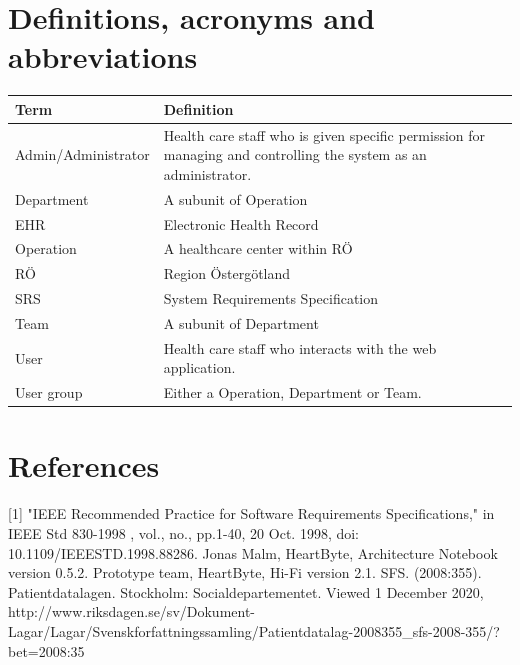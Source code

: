 \documentclass{scrreprt}
\begin{document}
\section{Definitions, acronyms and abbreviations}
\label{section:def}
\begin{center}
\begin{tabularx}{\linewidth}{| l | X |}
 \hline
 \textbf{Term} & \textbf{Definition} \\ 
 \hline
   Admin/Administrator & Health care staff who is given specific permission for managing and controlling the system as an administrator.  \\ 
  \hline
    Department & A subunit of Operation \\
  \hline
   EHR & Electronic Health Record \\ 
   \hline
      Operation & A healthcare center within RÖ \\ 
  \hline
    RÖ  & Region Östergötland  \\ 
  \hline
    SRS & System Requirements Specification \\
  \hline
    Team & A subunit of Department \\ 
  \hline
  User  & Health care staff who interacts with the web application.  \\
  \hline
  User group & Either a Operation, Department or Team. \\ 
  \hline
\end{tabularx}
\end{center}

\section{References}
[1] "IEEE Recommended Practice for Software Requirements Specifications," in IEEE Std 830-1998 , vol., no., pp.1-40, 20 Oct. 1998, doi: 10.1109/IEEESTD.1998.88286.
\newline
\newline
[2] Jonas Malm, HeartByte, Architecture Notebook version 0.5.2.
\newline
\newline
[3] Prototype team, HeartByte, Hi-Fi version 2.1. 
\newline
\newline
[4] SFS. (2008:355). Patientdatalagen. Stockholm: Socialdepartementet. Viewed 1 December 2020, http://www.riksdagen.se/sv/Dokument-Lagar/Lagar/Svenskforfattningssamling/Patientdatalag-2008355_sfs-2008-355/?bet=2008:35
\end{document}
